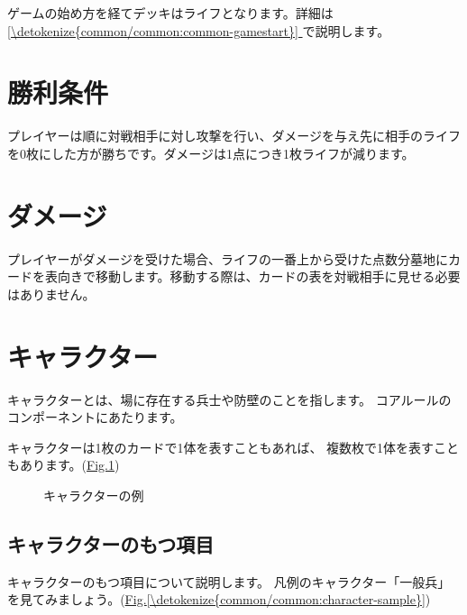 \documentclass[letterpaper,10pt,dvipdfmx]{sphinxmanual}
\begin{document}
\sphinxAtStartPar
ゲームの始め方を経てデッキはライフとなります。詳細は \hyperref[\detokenize{common/common:common-gamestart}]{\ref{\detokenize{common/common:common-gamestart}} } で説明します。


\section{勝利条件}
\label{\detokenize{common/common:id8}}
\sphinxAtStartPar
プレイヤーは順に対戦相手に対し攻撃を行い、ダメージを与え先に相手のライフを0枚にした方が勝ちです。ダメージは1点につき1枚ライフが減ります。

\ignorespaces 

\section{ダメージ}
\label{\detokenize{common/common:index-6}}\label{\detokenize{common/common:id9}}
\sphinxAtStartPar
プレイヤーがダメージを受けた場合、ライフの一番上から受けた点数分墓地にカードを表向きで移動します。移動する際は、カードの表を対戦相手に見せる必要はありません。

\ignorespaces 

\section{キャラクター}
\label{\detokenize{common/common:index-7}}\label{\detokenize{common/common:id10}}
\sphinxAtStartPar
キャラクターとは、場に存在する兵士や防壁のことを指します。
コアルールのコンポーネントにあたります。

\sphinxAtStartPar
キャラクターは1枚のカードで1体を表すこともあれば、
複数枚で1体を表すこともあります。(\hyperref[\detokenize{common/common:character}]{Fig.\@ \ref{\detokenize{common/common:character}}})

\begin{figure}[htbp]
\centering
\capstart

\noindent{}
\caption{キャラクターの例}\label{\detokenize{common/common:id51}}\label{\detokenize{common/common:character}}\end{figure}


\subsection{キャラクターのもつ項目}
\label{\detokenize{common/common:id11}}
\sphinxAtStartPar
キャラクターのもつ項目について説明します。
凡例のキャラクター「一般兵」を見てみましょう。(\hyperref[\detokenize{common/common:character-sample}]{Fig.\@ \ref{\detokenize{common/common:character-sample}}})
\end{document}

